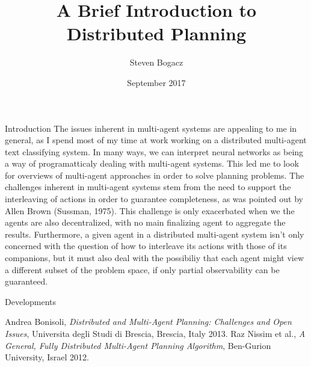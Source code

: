 \documentclass{article}
\title{A Brief Introduction to Distributed Planning}
\author{Steven Bogacz}
\date{September 2017}
\begin{document}
\maketitle
\begin{section}{Introduction}
	The issues inherent in multi-agent systems are appealing to me in general, as I spend most
	of my time at work working on a distributed multi-agent text classifying system. In many
	ways, we can interpret neural networks as being a way of programatticaly dealing with multi-agent
	systems. This led me to look for overviews of multi-agent approaches in order to solve planning
	problems. The challenges inherent in multi-agent systems stem from the need to support the 
	interleaving of actions in order to guarantee completeness, as was pointed out by Allen Brown (Sussman, 1975).
	This challenge is only exacerbated when we the agents are also decentralized, with no main finalizing agent
	to aggregate the results. Furthermore, a given agent in a distributed multi-agent system 
	isn't only concerned with the question of how to interleave its actions with those of its 
	companions, but it must also deal with the possibiliy that each agent might view a different subset of
	the problem space, if only partial observability can be guaranteed.\cite{bonisoli} 
\end{section}
\begin{section}{Developments}

\end{section}
\begin{thebibliography}{9}

	Andrea Bonisoli,
	\textit{Distributed and Multi-Agent Planning: Challenges and Open Issues},
	Universita degli Studi di Brescia,
	Brescia, Italy
  2013.
  Raz Nissim et al.,
  \textit{A General, Fully Distributed Multi-Agent Planning Algorithm},
  Ben-Gurion University,
  Israel
  2012.

\end{thebibliography}
\end{document}
